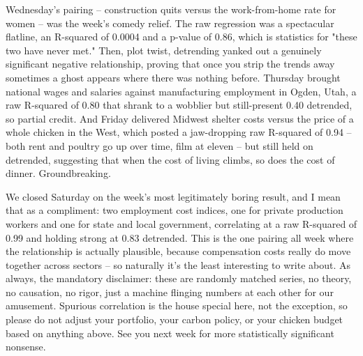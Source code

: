 Wednesday's pairing -- construction quits versus the work-from-home rate for women -- was the week's comedy relief. The raw regression was a spectacular flatline, an R-squared of 0.0004 and a p-value of 0.86, which is statistics for "these two have never met." Then, plot twist, detrending yanked out a genuinely significant negative relationship, proving that once you strip the trends away sometimes a ghost appears where there was nothing before. Thursday brought national wages and salaries against manufacturing employment in Ogden, Utah, a raw R-squared of 0.80 that shrank to a wobblier but still-present 0.40 detrended, so partial credit. And Friday delivered Midwest shelter costs versus the price of a whole chicken in the West, which posted a jaw-dropping raw R-squared of 0.94 -- both rent and poultry go up over time, film at eleven -- but still held on detrended, suggesting that when the cost of living climbs, so does the cost of dinner. Groundbreaking.

We closed Saturday on the week's most legitimately boring result, and I mean that as a compliment: two employment cost indices, one for private production workers and one for state and local government, correlating at a raw R-squared of 0.99 and holding strong at 0.83 detrended. This is the one pairing all week where the relationship is actually plausible, because compensation costs really do move together across sectors -- so naturally it's the least interesting to write about. As always, the mandatory disclaimer: these are randomly matched series, no theory, no causation, no rigor, just a machine flinging numbers at each other for our amusement. Spurious correlation is the house special here, not the exception, so please do not adjust your portfolio, your carbon policy, or your chicken budget based on anything above. See you next week for more statistically significant nonsense.
